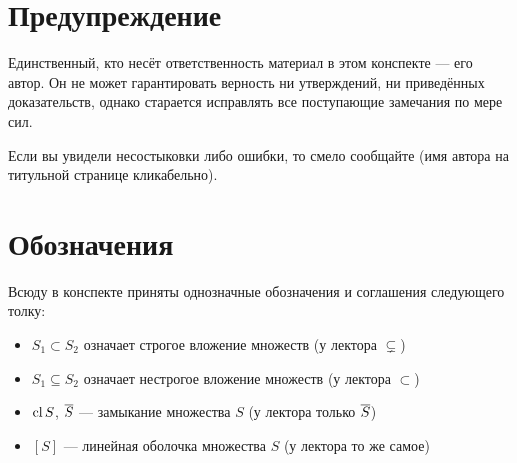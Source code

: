 \section*{Предупреждение}

Единственный, кто несёт ответственность материал в этом конспекте --- его автор. Он не может гарантировать верность ни утверждений, ни приведённых доказательств, однако старается исправлять все поступающие замечания по мере сил.

Если вы увидели несостыковки либо ошибки, то смело сообщайте (имя автора на титульной странице кликабельно).

\section*{Обозначения}

Всюду в конспекте приняты однозначные обозначения и соглашения следующего толку:

\begin{itemize}
	\item $S_1 \subset S_2$ означает строгое вложение множеств (у лектора $\subsetneq$)
	
	\item $S_1 \subseteq S_2$ означает нестрогое вложение множеств (у лектора $\subset$)
	
	\item $\operatorname{cl} S$, $\overline{S}$ --- замыкание множества $S$ (у лектора только $\overline{S}$)
	
	\item $[S]$ --- линейная оболочка множества $S$ (у лектора то же самое)
\end{itemize}